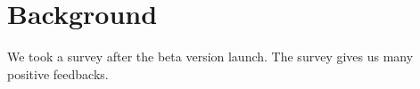 \documentclass[letterpaper,11pt]{article}
\begin{document}
\section{Background}
We took a survey after the beta version launch. The survey gives us many positive 
feedbacks. 
\begin{center}
\end{center}
    
\begin{center}
\end{center}

\begin{center}
\end{center}
\end{document}
